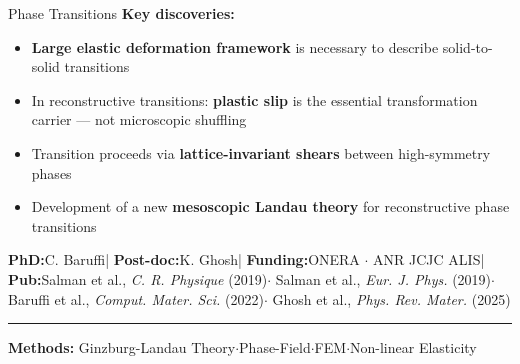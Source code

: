 \documentclass[10pt, aspectratio=169]{beamer}
\begin{document}
\begin{frame}{Phase Transitions}
{\scriptsize \color{SteelBlue}\textbf{Key discoveries:}}\\[0.03cm]
{\scriptsize
\begin{itemize}\setlength\itemsep{0.02cm}
    \item \textbf{Large elastic deformation framework} is necessary to describe solid-to-solid transitions
    \item In reconstructive transitions: \textbf{plastic slip} is the essential transformation carrier — not microscopic shuffling
    \item Transition proceeds via \textbf{lattice-invariant shears} between high-symmetry phases
    \item Development of a new \textbf{mesoscopic Landau theory} for reconstructive phase transitions
\end{itemize}
}
{\fontsize{5}{6}\selectfont \color{AcademicNavy!80}
    \textbf{PhD:}\enspace C. Baruffi\enspace|\enspace
    \textbf{Post-doc:}\enspace K. Ghosh\enspace|\enspace
    \textbf{Funding:}\enspace ONERA $\cdot$ ANR JCJC ALIS\enspace|\enspace
    \textbf{Pub:}\enspace Salman et al., \textit{C. R. Physique} (2019)\enspace$\cdot$\enspace
    Salman et al., \textit{Eur. J. Phys.} (2019)\enspace$\cdot$\enspace
    Baruffi et al., \textit{Comput. Mater. Sci.} (2022)\enspace$\cdot$\enspace
    Ghosh et al., \textit{Phys. Rev. Mater.} (2025)
}

\vfill
\textcolor{AcademicNavy!25}{\rule{\linewidth}{0.3pt}}
\begin{center}
{\scriptsize \color{AcademicNavy!80}
\textbf{Methods:}\enspace
Ginzburg-Landau Theory\enspace$\cdot$\enspace Phase-Field\enspace$\cdot$\enspace FEM\enspace$\cdot$\enspace Non-linear Elasticity
}
\end{center}

\end{frame}
\end{document}
